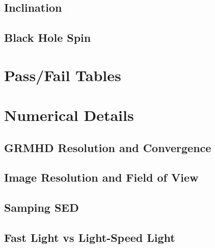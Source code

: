 \documentclass[twocolumn,twocolappendix,tighten,dvipsnames,linenumbers]{aastex63}
\begin{document}
\subsection{Inclination}

\subsection{Black Hole Spin}

\clearpage

 \software{\ehtim, \difmap, \smili, \dmc, \themis, \foci}

\appendix

\section{Pass/Fail Tables}

\clearpage

\section{Numerical Details}

\subsection{GRMHD Resolution and Convergence}

\subsection{Image Resolution and Field of View}

\subsection{Samping SED}

\subsection{Fast Light vs Light-Speed Light}

\clearpage




\end{document}
